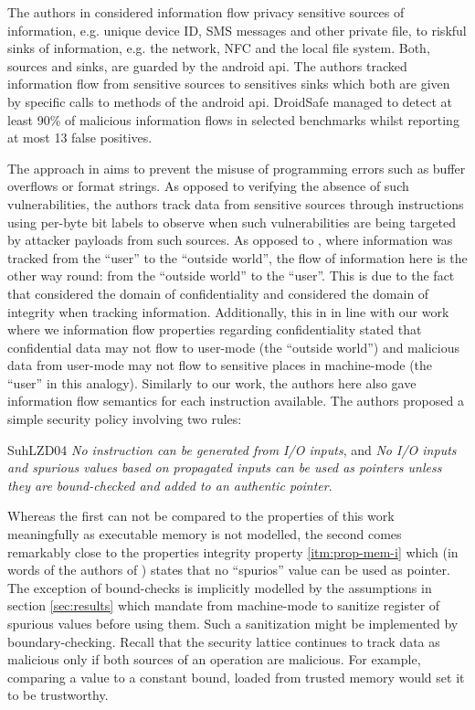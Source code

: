 The authors in \cite{GordonKPGNR15} considered information flow privacy sensitive sources of information, e.g. unique device ID, SMS messages and other private file, to riskful sinks of information, e.g. the network, NFC and the local file system.
Both, sources and sinks, are guarded by the android \gls{api}.
The authors tracked information flow from sensitive sources to sensitives sinks which both are given by specific calls to methods of the android \gls{api}.
DroidSafe managed to detect at least 90\% of malicious information flows in selected benchmarks whilst reporting at most 13 false positives.

The approach in \cite{SuhLZD04} aims to prevent the misuse of programming errors such as buffer overflows or format strings.
As opposed to verifying the absence of such vulnerabilities, the authors track data from sensitive sources through instructions using per-byte bit labels to observe when such vulnerabilities are being targeted by attacker payloads from such sources.
As opposed to \cite{GordonKPGNR15}, where information was tracked from the \enquote{user} to the \enquote{outside world}, the flow of information here is the other way round: from the \enquote{outside world} to the \enquote{user}.
This is due to the fact that \cite{GordonKPGNR15} considered the domain of confidentiality and \cite{SuhLZD04} considered the domain of integrity when tracking information.
Additionally, this in in line with our work where we information flow properties regarding confidentiality stated that confidential data may not flow to user-mode (the \enquote{outside world}) and malicious data from user-mode may not flow to sensitive places in machine-mode (the \enquote{user} in this analogy).
Similarly to our work, the authors here also gave information flow semantics for each instruction available.
The authors proposed a simple security policy involving two rules:
\begin{displaycquote}{SuhLZD04}
    \textit{No instruction can be generated from I/O inputs}, and \textit{No I/O inputs and spurious values based on propagated inputs can be used as pointers unless they are bound-checked and added to an authentic pointer}.
\end{displaycquote}

Whereas the first can not be compared to the properties of this work meaningfully as executable memory is not modelled, the second comes remarkably close to the properties integrity property \ref{itm:prop-mem-i} which (in words of the authors of \cite{SuhLZD04}) states that no \enquote{spurios} value can be used as pointer.
The exception of bound-checks is implicitly modelled by the  assumptions in section \ref{sec:results} which mandate from machine-mode to sanitize register of spurious values before using them.
Such a sanitization might be implemented by boundary-checking.
Recall that the security lattice continues to track data as malicious only if both sources of an operation are malicious.
For example, comparing a value to a constant bound, loaded from trusted memory would set it to be trustworthy.

